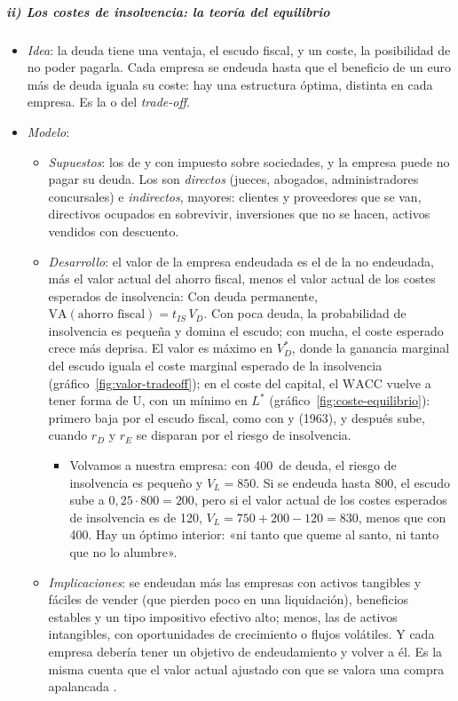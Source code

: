 \documentclass[11pt]{article}
\begin{document}
\subparagraph{ii) Los costes de insolvencia: la teoría del equilibrio}

\begin{itemize}
\item \emph{Idea}: la deuda tiene una ventaja, el escudo fiscal, y un coste, la posibilidad de no poder pagarla. Cada empresa se endeuda hasta que el beneficio de un euro más de deuda iguala su coste: hay una estructura óptima, distinta en cada empresa. Es la  o del \emph{trade-off}\nocite{KrausLitzenberger1973State,Kim1978Mean}.
\item \emph{Modelo}:
  \begin{itemize}
  \item \emph{Supuestos}: los de  y  con impuesto sobre sociedades, y la empresa puede no pagar su deuda. Los  son \emph{directos} (jueces, abogados, administradores concursales) e \emph{indirectos}, mayores: clientes y proveedores que se van, directivos ocupados en sobrevivir, inversiones que no se hacen, activos vendidos con descuento.
  \item \emph{Desarrollo}: el valor de la empresa endeudada es el de la no endeudada, más el valor actual del ahorro fiscal, menos el valor actual de los costes esperados de insolvencia:
    Con deuda permanente, $\mathrm{VA}(\text{ahorro fiscal})=t_{IS}\,V_D$. Con poca deuda, la probabilidad de insolvencia es pequeña y domina el escudo; con mucha, el coste esperado crece más deprisa. El valor es máximo en $V_D^*$, donde la ganancia marginal del escudo iguala el coste marginal esperado de la insolvencia (gráfico~\ref{fig:valor-tradeoff}); en el coste del capital, el $\mathrm{WACC}$ vuelve a tener forma de U, con un mínimo en $L^*$ (gráfico~\ref{fig:coste-equilibrio}): primero baja por el escudo fiscal, como con  y  (1963), y después sube, cuando $r_D$ y $r_E$ se disparan por el riesgo de insolvencia.
    \begin{itemize}
    \item Volvamos a nuestra empresa: con 400~de deuda, el riesgo de insolvencia es pequeño y $V_L=850$. Si se endeuda hasta 800, el escudo sube a $0{,}25\cdot800=200$, pero si el valor actual de los costes esperados de insolvencia es de 120, $V_L=750+200-120=830$, menos que con 400. Hay un óptimo interior: «ni tanto que queme al santo, ni tanto que no lo alumbre».
    \end{itemize}
  \item \emph{Implicaciones}: se endeudan más las empresas con activos tangibles y fáciles de vender (que pierden poco en una liquidación), beneficios estables y un tipo impositivo efectivo alto; menos, las de activos intangibles, con oportunidades de crecimiento o flujos volátiles. Y cada empresa debería tener un objetivo de endeudamiento y volver a él. Es la misma cuenta que el valor actual ajustado con que se valora una compra apalancada .
  \end{itemize}
\end{itemize}
\end{document}
